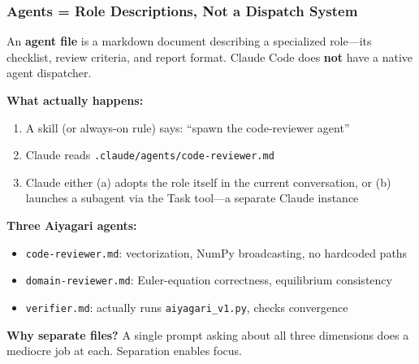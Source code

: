 \documentclass[10pt,english,aspectratio=169]{beamer}
\begin{document}
\begin{frame}
\frametitle{Agents = Role Descriptions, Not a Dispatch System}

An \textbf{agent file} is a markdown document describing a specialized role---its checklist, review criteria, and report format. Claude Code does \textbf{not} have a native agent dispatcher.

\vspace{0.15cm}

\textbf{What actually happens:}
\begin{enumerate}
    \item A skill (or always-on rule) says: ``spawn the code-reviewer agent''
    \item Claude reads \texttt{.claude/agents/code-reviewer.md}
    \item Claude either (a) adopts the role itself in the current conversation, or (b) launches a subagent via the Task tool---a separate Claude instance
\end{enumerate}

\vspace{0.15cm}

\textbf{Three Aiyagari agents:}
\begin{itemize}
    \item \texttt{code-reviewer.md}: vectorization, NumPy broadcasting, no hardcoded paths
    \item \texttt{domain-reviewer.md}: Euler-equation correctness, equilibrium consistency
    \item \texttt{verifier.md}: actually runs \texttt{aiyagari\_v1.py}, checks convergence
\end{itemize}

\vspace{0.1cm}

\textbf{Why separate files?} A single prompt asking about all three dimensions does a mediocre job at each. Separation enables focus.
\end{frame}
\end{document}
